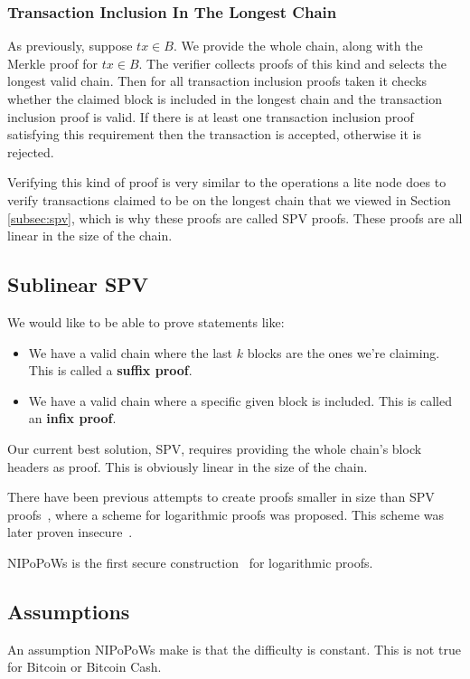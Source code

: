 \subsubsection{Transaction Inclusion In The Longest Chain}
As previously, suppose $tx \in B$. We provide the whole chain, along with the Merkle proof for $tx \in B$. The verifier collects proofs of this kind and selects the longest valid chain. Then for all transaction inclusion proofs taken it checks whether the claimed block is included in the longest chain and the transaction inclusion proof is valid. If there is at least one transaction inclusion proof satisfying this requirement then the transaction is accepted, otherwise it is rejected.

Verifying this kind of proof is very similar to the operations a lite node does to verify transactions claimed to be on the longest chain that we viewed in Section \ref{subsec:spv}, which is why these proofs are called SPV proofs. These proofs are all linear in the size of the chain.

\subsection{Sublinear SPV}
We would like to be able to prove statements like:

\begin{itemize}
  \item We have a valid chain where the last $k$ blocks are the ones we're claiming. This is called a \textbf{suffix proof}.
  \item We have a valid chain where a specific given block is included. This is called an \textbf{infix proof}.
\end{itemize}

Our current best solution, SPV, requires providing the whole chain's block headers as proof. This is obviously linear in the size of the chain.

There have been previous attempts to create proofs smaller in size than SPV proofs~\cite{KLS}, where a scheme for logarithmic proofs was proposed.  This scheme was later proven insecure~\cite{nipopows}.

NIPoPoWs is the first secure construction~\cite{nipopows} for logarithmic proofs.

\subsection{Assumptions}
An assumption NIPoPoWs make is that the difficulty is constant. This is not true for Bitcoin or Bitcoin Cash.

